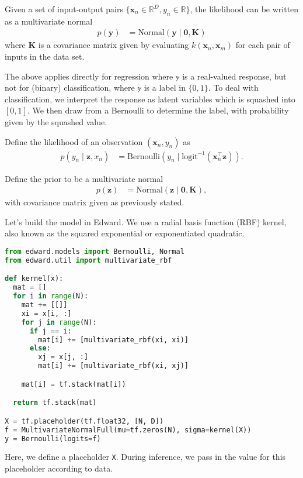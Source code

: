 Given a set of input-output pairs
$\{\mathbf{x}_n\in\mathbb{R}^D,y_n\in\mathbb{R}\}$,
the likelihood can be written as a multivariate normal
\begin{align*}
  p(\mathbf{y})
  &=
  \text{Normal}(\mathbf{y} \mid \mathbf{0}, \mathbf{K})
\end{align*}
where $\mathbf{K}$ is a covariance matrix given by evaluating
$k(\mathbf{x}_n, \mathbf{x}_m)$ for each pair of inputs in the data
set.

The above applies directly for regression where $\mathbb{y}$ is a
real-valued response, but not for (binary) classification, where $\mathbb{y}$
is a label in $\{0,1\}$. To deal with classification, we interpret the
response as latent variables which is squashed into $[0,1]$. We then
draw from a Bernoulli to determine the label, with probability given
by the squashed value.

Define the likelihood of an observation $(\mathbf{x}_n, y_n)$ as
\begin{align*}
  p(y_n \mid \mathbf{z}, x_n)
  &=
  \text{Bernoulli}(y_n \mid \text{logit}^{-1}(\mathbf{x}_n^\top \mathbf{z})).
\end{align*}

Define the prior to be a multivariate normal
\begin{align*}
  p(\mathbf{z})
  &=
  \text{Normal}(\mathbf{z} \mid \mathbf{0}, \mathbf{K}),
\end{align*}
with covariance matrix given as previously stated.

Let's build the model in Edward. We use a radial basis function (RBF)
kernel, also known as the squared exponential or exponentiated
quadratic.
\begin{lstlisting}[language=Python]
from edward.models import Bernoulli, Normal
from edward.util import multivariate_rbf

def kernel(x):
  mat = []
  for i in range(N):
    mat += [[]]
    xi = x[i, :]
    for j in range(N):
      if j == i:
        mat[i] += [multivariate_rbf(xi, xi)]
      else:
        xj = x[j, :]
        mat[i] += [multivariate_rbf(xi, xj)]

    mat[i] = tf.stack(mat[i])

  return tf.stack(mat)

X = tf.placeholder(tf.float32, [N, D])
f = MultivariateNormalFull(mu=tf.zeros(N), sigma=kernel(X))
y = Bernoulli(logits=f)
\end{lstlisting}
Here, we define a placeholder \texttt{X}. During inference, we pass in
the value for this placeholder according to data.

